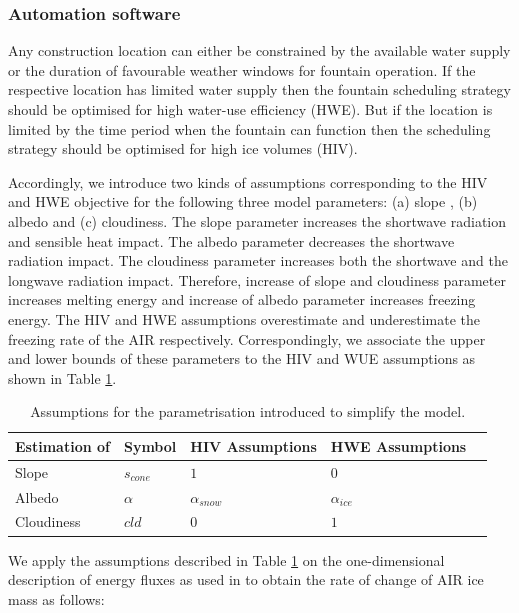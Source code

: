 \documentclass[tc, manuscript]{copernicus}
\begin{document}
\subsubsection{Automation software}

Any construction location can either be constrained by the available water supply or the duration of favourable
weather windows for fountain operation. If the respective location has limited water supply then the fountain
scheduling strategy should be optimised for high water-use efficiency (HWE). But if the location is limited by
the time period when the fountain can function then the scheduling strategy should be optimised for high ice
volumes (HIV).

Accordingly, we introduce two kinds of assumptions corresponding to the HIV and HWE objective for the following
three model parameters: (a) slope , (b) albedo and (c) cloudiness. The slope parameter increases the shortwave
radiation and sensible heat impact. The albedo parameter decreases the shortwave radiation impact. The
cloudiness parameter increases both the shortwave and the longwave radiation impact. Therefore, increase of
slope and cloudiness parameter increases melting energy and increase of albedo parameter increases freezing
energy. The HIV and HWE assumptions overestimate and underestimate the freezing rate of the AIR respectively.
Correspondingly, we associate the upper and lower bounds of these parameters to the HIV and WUE assumptions as
shown in Table \ref{tab:assumptions}.

\begin{table}[]
\centering
\caption{Assumptions for the parametrisation introduced to simplify the model.}
\label{tab:assumptions}
\begin{tabular}{@{}lllll@{}}
\toprule
\textbf{Estimation of} & \textbf{Symbol} & \textbf{HIV Assumptions} & \textbf{HWE Assumptions} & \\ \midrule
\multicolumn{1}{|l}{Slope}        & $s_{cone}$ & $ 1 $ & $0$ & \multicolumn{1}{l|}{} \\ \midrule
\multicolumn{1}{|l}{Albedo} & $\alpha$ & $\alpha_{snow}$ & $\alpha_{ice}$ & \multicolumn{1}{l|}{} \\\midrule 
\multicolumn{1}{|l}{Cloudiness}  & $cld$ & $0$ & $1$ & \multicolumn{1}{l|}{} \\ \bottomrule
\end{tabular}
\end{table}

We apply the assumptions described in Table \ref{tab:assumptions} on the one-dimensional description of energy
fluxes as used in \cite{balasubramanianInfluenceMeteorologicalConditions2022} to obtain the rate of change of
AIR ice mass as follows: 
\end{document}
